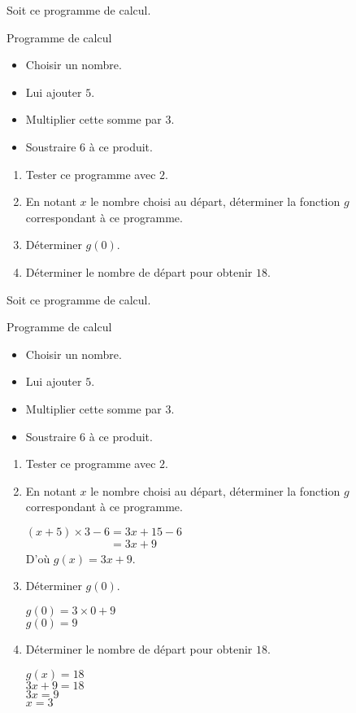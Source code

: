 \begin{exercice}
    Soit ce programme de calcul.
    \begin{myBox}{Programme de calcul}
        \begin{itemize}
            \item Choisir un nombre.
            \item Lui ajouter $5$.
            \item Multiplier cette somme par $3$.
            \item Soustraire $6$ à ce produit.
        \end{itemize}
    \end{myBox}
    \begin{enumerate}
        \item Tester ce programme avec $2$.
        \item En notant $x$ le nombre choisi au départ, déterminer la fonction $g$ correspondant à ce programme.
        \item Déterminer $g(0)$.
        \item Déterminer le nombre de départ pour obtenir $18$.
    \end{enumerate}
\end{exercice}
\begin{corrige}
    Soit ce programme de calcul.
    \begin{myBox}{Programme de calcul}
        \noindent
        \begin{itemize}
            \item Choisir un nombre.
            \item Lui ajouter $5$.
            \item Multiplier cette somme par $3$.
            \item Soustraire $6$ à ce produit.
        \end{itemize}
    \end{myBox}
    \begin{enumerate}
        \item Tester ce programme avec $2$.
        
        {\red {}}
        \item En notant $x$ le nombre choisi au départ, déterminer la fonction $g$ correspondant à ce programme.
        
        {\red {}
        
        $(x+5)\times3-6=3x+15-6$\\$\phantom{(x+5)\times3-6}=3x+9$\\ D'où $g(x)=3x+9$.
        }
        \item Déterminer $g(0)$.
        
        {\red $g(0)=3\times0+ 9$\\$g(0)=9$}
        \item Déterminer le nombre de départ pour obtenir $18$.
        
        {\red $g(x)=18$\\$3x+9=18$\\$3x=9$\\$x=3$}
    \end{enumerate}
\end{corrige}
